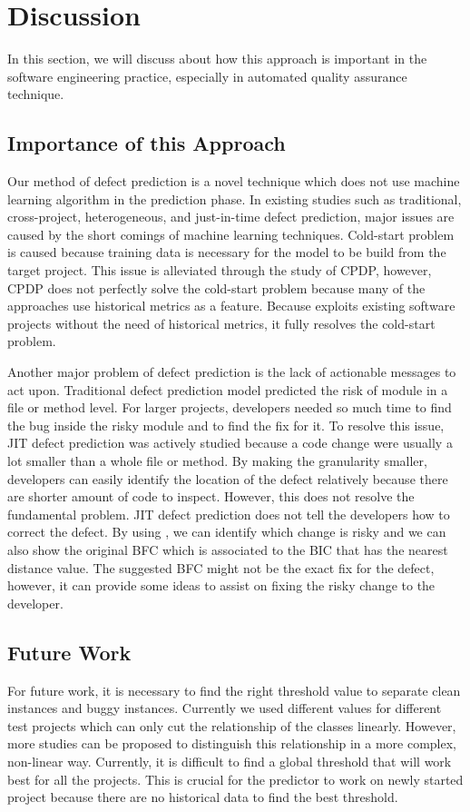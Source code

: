 \section{Discussion}
In this section, we will discuss about how this approach is important in the software engineering practice, especially in automated quality assurance technique.

\subsection{Importance of this Approach}
Our method of defect prediction is a novel technique which does not use machine learning algorithm in the prediction phase.
In existing studies such as traditional, cross-project, heterogeneous, and just-in-time defect prediction, major issues are caused by the short comings of machine learning techniques.
Cold-start problem is caused because training data is necessary for the model to be build from the target project.
This issue is alleviated through the study of CPDP, however, CPDP does not perfectly solve the cold-start problem because many of the approaches use historical metrics as a feature. 
Because {\simfinmo} exploits existing software projects without the need of historical metrics, it fully resolves the cold-start problem.

Another major problem of defect prediction is the lack of actionable messages to act upon. 
Traditional defect prediction model predicted the risk of module in a file or method level.
For larger projects, developers needed so much time to find the bug inside the risky module and to find the fix for it.
To resolve this issue, JIT defect prediction was actively studied because a code change were usually a lot smaller than a whole file or method.
By making the granularity smaller, developers can easily identify the location of the defect relatively because there are shorter amount of code to inspect.
However, this does not resolve the fundamental problem.
JIT defect prediction does not tell the developers how to correct the defect.
By using {\simfinmo}, we can identify which change is risky and we can also show the original BFC which is associated to the BIC that has the nearest distance value.
The suggested BFC might not be the exact fix for the defect, however, it can provide some ideas to assist on fixing the risky change to the developer.

\subsection{Future Work}
For future work, it is necessary to find the right threshold value to separate clean instances and buggy instances.
Currently we used different values for different test projects which can only cut the relationship of the classes linearly.
However, more studies can be proposed to distinguish this relationship in a more complex, non-linear way.
Currently, it is difficult to find a global threshold that will work best for all the projects.
This is crucial for the predictor to work on newly started project because there are no historical data to find the best threshold.

